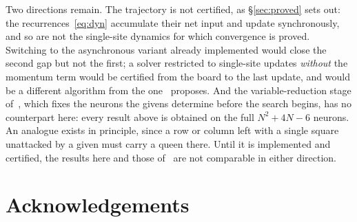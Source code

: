 \documentclass{easychair}
\newcommand{\secref}[1]{\hyperref[#1]{\textcolor{academicpurple}{\S\ref*{#1}}}}
\newcommand{\citeref}[1]{\textcolor{academicpurple}{\cite{#1}}}
\begin{document}
Two directions remain. The trajectory is not certified, as \secref{sec:proved} sets out: the
recurrences~\eqref{eq:dyn} accumulate their net input and update synchronously, and so are not the
single-site dynamics for which convergence is proved. Switching to the asynchronous variant already
implemented would close the second gap but not the first; a solver restricted to single-site
updates \emph{without} the momentum term would be certified from the board to the last update, and
would be a different algorithm from the one~\citeref{liwang2022} proposes. And the variable-reduction stage of~\citeref{liwang2022},
which fixes the neurons the givens determine before the search begins, has no counterpart here: every
result above is obtained on the full $N^{2} + 4N - 6$ neurons. An analogue exists in principle,
since a row or column left with a single square unattacked by a given must carry a queen there. Until
it is implemented and certified, the results here and those of~\citeref{liwang2022} are not
comparable in either direction.

\section*{Acknowledgements}
\end{document}
